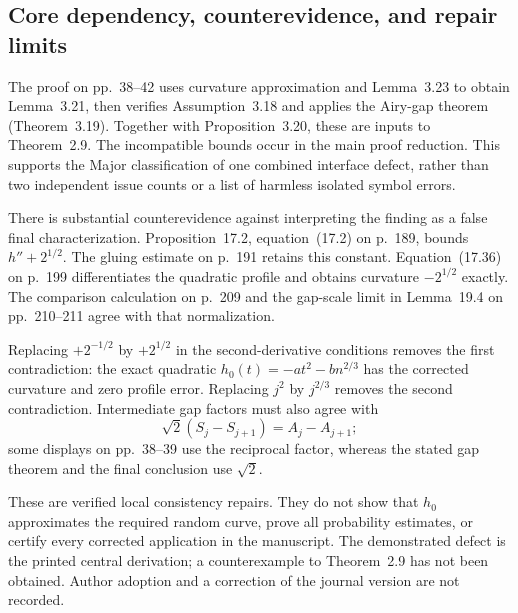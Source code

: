 \documentclass[10pt]{article}
\begin{document}
\subsection*{Core dependency, counterevidence, and repair limits}
The proof on pp. 38–42 uses curvature approximation and Lemma 3.23 to obtain Lemma 3.21, then verifies Assumption 3.18 and applies the Airy-gap theorem (Theorem 3.19). Together with Proposition 3.20, these are inputs to Theorem 2.9. The incompatible bounds occur in the main proof reduction. This supports the Major classification of one combined interface defect, rather than two independent issue counts or a list of harmless isolated symbol errors.\par
There is substantial counterevidence against interpreting the finding as a false final characterization. Proposition 17.2, equation (17.2) on p. 189, bounds \(h''+2^{1/2}\). The gluing estimate on p. 191 retains this constant. Equation (17.36) on p. 199 differentiates the quadratic profile and obtains curvature \(-2^{1/2}\) exactly. The comparison calculation on p. 209 and the gap-scale limit in Lemma 19.4 on pp. 210–211 agree with that normalization.\par
Replacing \(+2^{-1/2}\) by \(+2^{1/2}\) in the second-derivative conditions removes the first contradiction: the exact quadratic \(h_0(t)=-at^2-bn^{2/3}\) has the corrected curvature and zero profile error. Replacing \(j^2\) by \(j^{2/3}\) removes the second contradiction. Intermediate gap factors must also agree with \[\sqrt2(S_j-S_{j+1})=A_j-A_{j+1};\] some displays on pp. 38–39 use the reciprocal factor, whereas the stated gap theorem and the final conclusion use \(\sqrt2\).\par
These are verified local consistency repairs. They do not show that \(h_0\) approximates the required random curve, prove all probability estimates, or certify every corrected application in the manuscript. The demonstrated defect is the printed central derivation; a counterexample to Theorem 2.9 has not been obtained. Author adoption and a correction of the journal version are not recorded.\par
\end{document}
